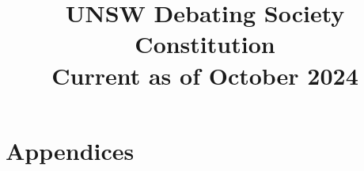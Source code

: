 \documentclass[12pt,a4paper]{article}
\title{UNSW Debating Society Constitution \\[0.5em] \large Current as of October 2024}
\date{}
\begin{document}
\maketitle
\newpage
\tableofcontents













\appendix
\section{Appendices}


\end{document}
